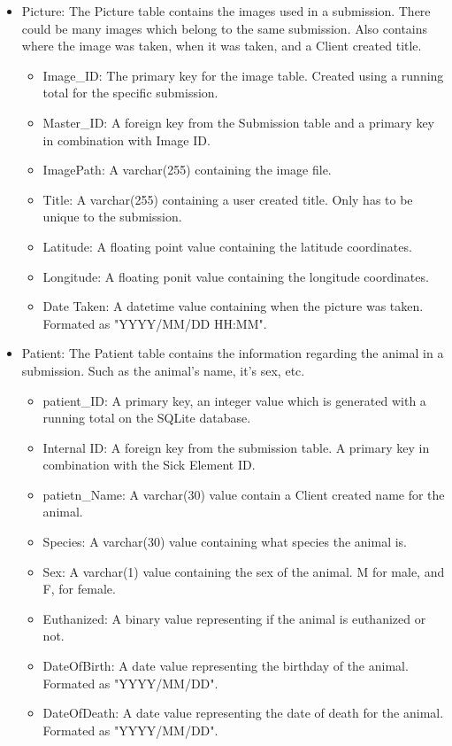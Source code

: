 \documentclass[onecolumn, draftclsnofoot, article, 10pt, compsoc]{IEEEtran}
\begin{document}
\begin{itemize}
\item Picture:\newline
The Picture table contains the images used in a submission. There could be many images which belong to the same submission. Also contains where the image was taken, when it was taken, and a Client created title.
\begin{itemize}
\item Image\_ID: The primary key for the image table. Created using a running total for the specific submission.
\item Master\_ID: A foreign key from the Submission table and a primary key in combination with Image ID.
\item ImagePath: A varchar(255) containing the image file.
\item Title: A varchar(255) containing a user created title. Only has to be unique to the submission. 
\item Latitude: A floating point value containing the latitude coordinates.
\item Longitude: A floating ponit value containing the longitude coordinates.
\item Date Taken: A datetime value containing when the picture was taken. Formated as "YYYY/MM/DD HH:MM".
\end{itemize}

\item Patient:\newline
The Patient table contains the information regarding the animal in a submission. Such as the animal's name, it's sex, etc.
\begin{itemize}
\item patient\_ID: A primary key, an integer value which is generated with a running total on the SQLite database.
\item Internal ID: A foreign key from the submission table. A primary key in combination with the Sick Element ID.
\item patietn\_Name: A varchar(30) value contain a Client created name for the animal.
\item Species: A varchar(30) value containing what species the animal is.
\item Sex: A varchar(1) value containing the sex of the animal. M for male, and F, for female.
\item Euthanized: A binary value representing if the animal is euthanized or not.
\item DateOfBirth: A date value representing the birthday of the animal. Formated as "YYYY/MM/DD".
\item DateOfDeath: A date value representing the date of death for the animal. Formated as "YYYY/MM/DD".
\end{itemize}


\end{itemize}
\end{document}

